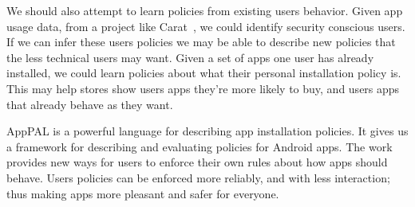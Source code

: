 \documentclass[twoside,letterpaper]{soups}
\begin{document}
We should also attempt to learn policies from existing users behavior.
Given app usage data, from a project like Carat~\citep{Oliner:2013ht}, we could identify security conscious users.
If we can infer these users policies we may be able to describe new policies that the less technical users may want.
Given a set of apps one user has already installed, we could learn policies about what their personal installation policy is.
This may help stores show users apps they're more likely to buy, and users apps that already behave as they want.

AppPAL is a powerful language for describing app installation policies.
It gives us a framework for describing and evaluating policies for Android apps.
The work provides new ways for users to enforce their own rules about how apps should behave.
Users policies can be enforced more reliably, and with less interaction;
thus making apps more pleasant and safer for everyone.



\end{document}
